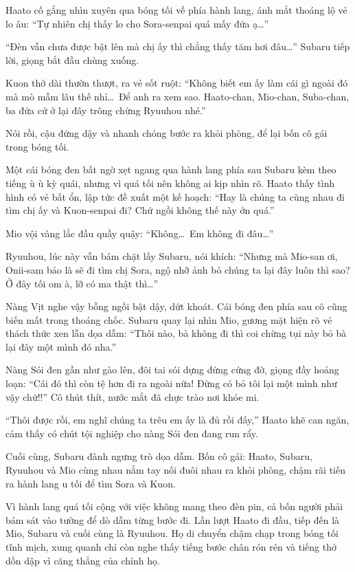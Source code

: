 \documentclass[../main.tex]{subfiles}
\begin{document}
Haato cố gắng nhìn xuyên qua bóng tối về phía hành lang, ánh mắt thoáng lộ vẻ lo âu: ``Tự nhiên chị thấy lo cho Sora-senpai quá mấy đứa ạ\dots''

``Đèn vẫn chưa được bật lên mà chị ấy thì chẳng thấy tăm hơi đâu\dots'' Subaru tiếp lời, giọng bắt đầu chùng xuống.

Kuon thở dài thườn thượt, ra vẻ sốt ruột: ``Không biết em ấy làm cái gì ngoài đó mà mò mẫm lâu thế nhỉ\dots\ Để anh ra xem sao. Haato-chan, Mio-chan, Suba-chan, ba đứa cứ ở lại đây trông chừng Ryuuhou nhé.''

Nói rồi, cậu đứng dậy và nhanh chóng bước ra khỏi phòng, để lại bốn cô gái trong bóng tối.


Một cái bóng đen bất ngờ xẹt ngang qua hành lang phía sau Subaru kèm theo tiếng ù ù kỳ quái, nhưng vì quá tối nên không ai kịp nhìn rõ. Haato thấy tình hình có vẻ bất ổn, lập tức đề xuất một kế hoạch: ``Hay là chúng ta cùng nhau đi tìm chị ấy và Kuon-senpai đi? Chứ ngồi không thế này ớn quá.''

Mio vội vàng lắc đầu quầy quậy: ``Không\dots\ Em không đi đâu\dots''

Ryuuhou, lúc này vẫn bám chặt lấy Subaru, nói khích: ``Nhưng mà Mio-san ơi, Onii-sam bảo là sẽ đi tìm chị Sora, ngộ nhỡ ảnh bỏ chúng ta lại đây luôn thì sao? Ở đây tối om à, lỡ có ma thật thì\dots''

Nàng Vịt nghe vậy bỗng ngồi bật dậy, dứt khoát. Cái bóng đen phía sau cô cũng biến mất trong thoáng chốc. Subaru quay lại nhìn Mio, gương mặt hiện rõ vẻ thách thức xen lẫn dọa dẫm: ``Thôi nào, bà không đi thì coi chừng tụi này bỏ bà lại đây một mình đó nha.''

Nàng Sói đen gần như gào lên, đôi tai sói dựng đứng cứng đờ, giọng đầy hoảng loạn: ``Cái đó thì còn tệ hơn đi ra ngoài nữa! Đừng có bỏ tôi lại một mình như vậy chứ!!'' Cô thút thít, nước mắt đã chực trào nơi khóe mi.

``Thôi được rồi, em nghĩ chúng ta trêu em ấy là đủ rồi đấy,'' Haato khẽ can ngăn, cảm thấy có chút tội nghiệp cho nàng Sói đen đang run rẩy.

Cuối cùng, Subaru đành ngưng trò dọa dẫm. Bốn cô gái: Haato, Subaru, Ryuuhou và Mio cùng nhau nắm tay nối đuôi nhau ra khỏi phòng, chậm rãi tiến ra hành lang u tối để tìm Sora và Kuon.

\ct

Vì hành lang quá tối cộng với việc không mang theo đèn pin, cả bốn người phải bám sát vào tường để dò dẫm từng bước đi. Lần lượt Haato đi đầu, tiếp đến là Mio, Subaru và cuối cùng là Ryuuhou. Họ di chuyển chậm chạp trong bóng tối tĩnh mịch, xung quanh chỉ còn nghe thấy tiếng bước chân rón rén và tiếng thở dồn dập vì căng thẳng của chính họ.
\end{document}

